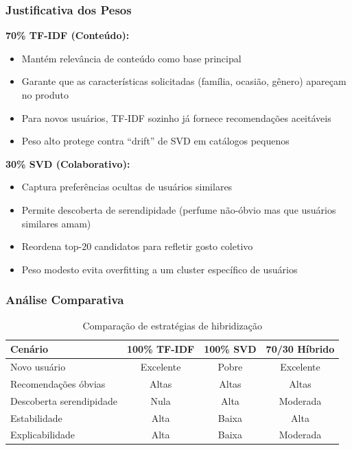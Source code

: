 \documentclass[12pt,a4paper]{article}
\begin{document}
\subsubsection{Justificativa dos Pesos}

\textbf{70\% TF-IDF (Conteúdo):}
\begin{itemize}
    \item Mantém relevância de conteúdo como base principal
    \item Garante que as características solicitadas (família, ocasião, gênero) apareçam no produto
    \item Para novos usuários, TF-IDF sozinho já fornece recomendações aceitáveis
    \item Peso alto protege contra ``drift'' de SVD em catálogos pequenos
\end{itemize}

\textbf{30\% SVD (Colaborativo):}
\begin{itemize}
    \item Captura preferências ocultas de usuários similares
    \item Permite descoberta de serendipidade (perfume não-óbvio mas que usuários similares amam)
    \item Reordena top-20 candidatos para refletir gosto coletivo
    \item Peso modesto evita overfitting a um cluster específico de usuários
\end{itemize}

\subsubsection{Análise Comparativa}

\begin{table}[H]
\centering
\begin{tabular}{|l|ccc|}
\toprule
\textbf{Cenário} & \textbf{100\% TF-IDF} & \textbf{100\% SVD} & \textbf{70/30 Híbrido} \\
\midrule
Novo usuário & Excelente & Pobre & Excelente \\
Recomendações óbvias & Altas & Altas & Altas \\
Descoberta serendipidade & Nula & Alta & Moderada \\
Estabilidade & Alta & Baixa & Alta \\
Explicabilidade & Alta & Baixa & Moderada \\
\bottomrule
\end{tabular}
\caption{Comparação de estratégias de hibridização}
\label{tab:hybrid}
\end{table}
\end{document}
